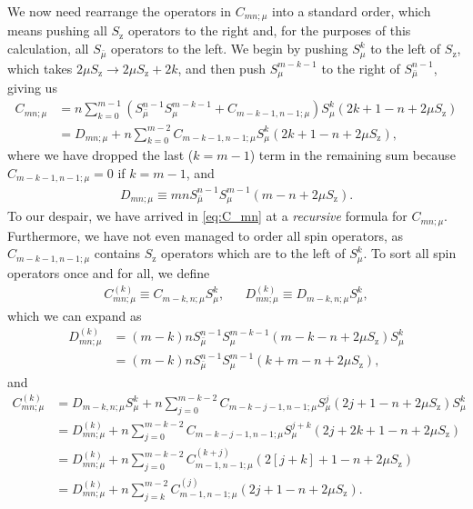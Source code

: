 \documentclass[aps,11pt,notitlepage,nofootinbib,longbibliography]{revtex4-1}
\newcommand{\p}[1]{\left(#1\right)} %
\renewcommand{\sp}[1]{\left[#1\right]} %
\newcommand{\z}{\text{z}}
\newcommand{\bmu}{{\bar\mu}}
\newcommand{\1}{\mathds{1}}
\begin{document}
We now need rearrange the operators in $C_{mn;\mu}$ into a standard
order, which means pushing all $S_\z$ operators to the right and, for
the purposes of this calculation, all $S_\bmu$ operators to the left.
We begin by pushing $S_\mu^k$ to the left of $S_\z$, which takes
$2\mu S_\z\to 2\mu S_\z+2k$, and then push $S_\mu^{m-k-1}$ to the
right of $S_\bmu^{n-1}$, giving us
\begin{align}
  C_{mn;\mu}
  &= n \sum_{k=0}^{m-1}
  \p{S_\bmu^{n-1} S_\mu^{m-k-1} + C_{m-k-1,n-1;\mu}} S_\mu^k
  \p{2k + 1 - n + 2\mu S_\z} \\
  &= D_{mn;\mu}
  + n \sum_{k=0}^{m-2} C_{m-k-1,n-1;\mu}
  S_\mu^k \p{2k + 1 - n + 2\mu S_\z},
  \label{eq:C_mn}
\end{align}
where we have dropped the last ($k=m-1$) term in the remaining sum
because $C_{m-k-1,n-1;\mu}=0$ if $k=m-1$, and
\begin{align}
  D_{mn;\mu}
  \equiv mn S_\bmu^{n-1} S_\mu^{m-1} \p{m - n + 2\mu S_\z}.
  \label{eq:D_mn}
\end{align}
To our despair, we have arrived in \eqref{eq:C_mn} at a {\it
  recursive} formula for $C_{mn;\mu}$.  Furthermore, we have not even
managed to order all spin operators, as $C_{m-k-1,n-1;\mu}$ contains
$S_\z$ operators which are to the left of $S_\mu^k$.  To sort all spin
operators once and for all, we define
\begin{align}
  C_{mn;\mu}^{(k)} \equiv C_{m-k,n;\mu} S_\mu^k,
  &&
  D_{mn;\mu}^{(k)} \equiv D_{m-k,n;\mu} S_\mu^k,
\end{align}
which we can expand as
\begin{align}
  D_{mn;\mu}^{(k)}
  &= \p{m-k}n S_\bmu^{n-1} S_\mu^{m-k-1}
  \p{m-k-n+2\mu S_\z} S_\mu^k \\
  &= \p{m-k}n S_\bmu^{n-1} S_\mu^{m-1} \p{k+m-n+2\mu S_\z},
  \label{eq:D_mn_k}
\end{align}
and
\begin{align}
  C_{mn;\mu}^{(k)}
  &= D_{m-k,n;\mu} S_\mu^k + n \sum_{j=0}^{m-k-2}
  C_{m-k-j-1,n-1;\mu} S_\mu^j \p{2j+1-n+2\mu S_\z} S_\mu^k \\
  &= D_{mn;\mu}^{(k)} + n \sum_{j=0}^{m-k-2}
  C_{m-k-j-1,n-1;\mu} S_\mu^{j+k} \p{2j+2k+1-n+2\mu S_\z} \\
  &= D_{mn;\mu}^{(k)} + n \sum_{j=0}^{m-k-2}
  C_{m-1,n-1;\mu}^{(k+j)} \p{2\sp{j+k}+1-n+2\mu S_\z} \\
  &= D_{mn;\mu}^{(k)} + n \sum_{j=k}^{m-2}
  C_{m-1,n-1;\mu}^{(j)} \p{2j+1-n+2\mu S_\z}.
  \label{eq:C_mn_k}
\end{align}
\end{document}
